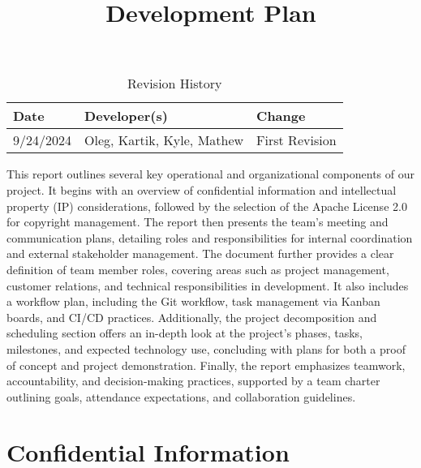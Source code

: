 \documentclass{article}
\title{Development Plan\\\progname}
\author{\authname}
\date{}
\begin{document}
\maketitle

\begin{table}[hp]
\caption{Revision History} \label{TblRevisionHistory}
\begin{tabularx}{\textwidth}{llX}
\toprule
\textbf{Date} & \textbf{Developer(s)} & \textbf{Change}\\
\midrule
9/24/2024 & Oleg, Kartik, Kyle, Mathew & First Revision\\

\bottomrule
\end{tabularx}
\end{table}

\newpage{}

This report outlines several key operational and organizational components of our project. It begins with an overview of confidential information and intellectual property (IP) considerations, followed by the selection of the Apache License 2.0 for copyright management. The report then presents the team’s meeting and communication plans, detailing roles and responsibilities for internal coordination and external stakeholder management. The document further provides a clear definition of team member roles, covering areas such as project management, customer relations, and technical responsibilities in development. It also includes a workflow plan, including the Git workflow, task management via Kanban boards, and CI/CD practices. Additionally, the project decomposition and scheduling section offers an in-depth look at the project's phases, tasks, milestones, and expected technology use, concluding with plans for both a proof of concept and project demonstration. Finally, the report emphasizes teamwork, accountability, and decision-making practices, supported by a team charter outlining goals, attendance expectations, and collaboration guidelines.






\section{Confidential Information} 
\end{document}
